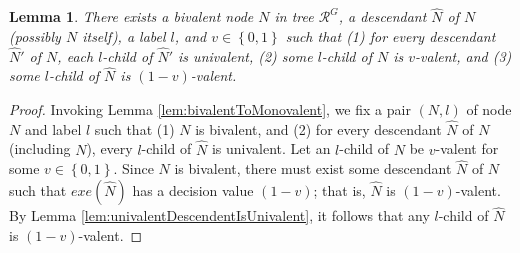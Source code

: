 \documentclass[11pt]{article}
\numberwithin{theorem}{section}
\newtheorem{lemma}[theorem]{Lemma}
\newcommand{\set}[1]{\left\{#1\right\}}
\begin{document}
\begin{lemma}\label{lem:bivalentTo1ValentAnd0Valent}
 There exists a bivalent node $N$ in tree $\mathcal{R}^{G}$, a descendant $\hat{N}$ of $N$ (possibly $N$ itself), a label $l$, and $v \in \set{0,1}$ such that (1) 
 for every descendant $\hat{N}'$ of $N$, each $l$-child of $\hat{N}'$ is univalent, (2) some $l$-child of $N$ is $v$-valent, and (3) some $l$-child of $\hat{N}$ is $(1-v)$-valent.
\end{lemma}
\begin{proof}
Invoking Lemma \ref{lem:bivalentToMonovalent}, we fix a pair $(N,l)$ of node $N$ and label $l$ such that (1) $N$ is bivalent, and (2) for every descendant $\hat{N}$ of $N$ (including $N$), every $l$-child of $\hat{N}$ is univalent. Let an $l$-child of $N$ be $v$-valent for some $v \in \set{0,1}$. Since $N$ is bivalent, there must exist some descendant $\hat{N}$ of $N$ such that $exe(\hat{N})$ has a decision value $(1-v)$; that is, $\hat{N}$ is $(1-v)$-valent. By Lemma \ref{lem:univalentDescendentIsUnivalent}, it follows that any $l$-child of $\hat{N}$ is $(1-v)$-valent.
\end{proof}
\end{document}
